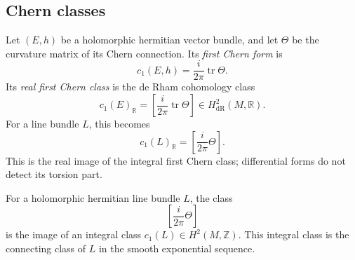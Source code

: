 \subsection{Chern classes}
\label{subsection-chern-classes}

\begin{definition}
\label{definition-first-chern-form}
Let $(E,h)$ be a holomorphic hermitian
vector bundle, and let $\Theta$ be the
curvature matrix of its Chern connection.
Its {\it first Chern form} is
$$
c_1(E,h)=\frac{i}{2\pi}
\operatorname{tr}\Theta.
$$
Its {\it real first Chern class} is
the de Rham cohomology class
$$
c_1(E)_{\mathbb{R}}
=\left[\frac{i}{2\pi}
\operatorname{tr}\Theta\right]
\in H^2_{\mathrm{dR}}(M,\mathbb{R}).
$$
For a line bundle $L$, this becomes
$$
c_1(L)_{\mathbb{R}}
=\left[\frac{i}{2\pi}\Theta\right].
$$
This is the real image of the integral
first Chern class; differential forms
do not detect its torsion part.
\end{definition}

\begin{lemma}
\label{lemma-first-chern-integral}
For a holomorphic hermitian line bundle
$L$, the class
$$
\left[\frac{i}{2\pi}\Theta\right]
$$
is the image of an integral class
$c_1(L)\in H^2(M,\mathbb{Z})$.
This integral class is the connecting
class of $L$ in the smooth exponential
sequence.
\end{lemma}

